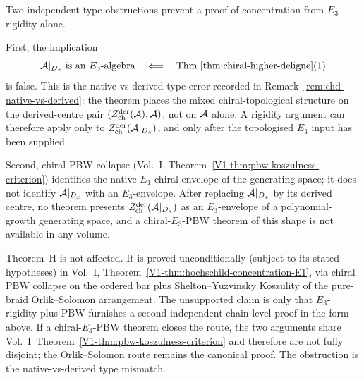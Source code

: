 \begin{remark}%
\label{rem:H-concentration-via-E3-rigidity-type-error-retraction}%
%
%
Two independent type obstructions prevent a proof of concentration
from $E_3$-rigidity alone.

First, the implication
\[
 \cA|_{D_x}\ \text{is an }E_3\text{-algebra}
 \quad\Longleftarrow\quad
 \text{Thm~\ref{thm:chiral-higher-deligne}(1)}
\]
is false. This is the native-vs-derived type error recorded in
Remark~\ref{rem:chd-native-vs-derived}: the theorem places the mixed
chiral-topological structure on the derived-centre pair
$(Z^{\mathrm{der}}_{\mathrm{ch}}(\mathcal{A}),\mathcal{A})$, not on $\mathcal{A}$ alone. A
rigidity argument can therefore apply only to
$Z^{\mathrm{der}}_{\mathrm{ch}}(\mathcal{A}|_{D_x})$, and only after the
topologised $E_3$ input has been supplied.

Second, chiral PBW collapse (Vol.~I,
Theorem~\ref*{V1-thm:pbw-koszulness-criterion}) identifies the
native $E_1$-chiral envelope of the generating space; it does not
identify $\mathcal{A}|_{D_x}$ with an $E_3$-envelope. After replacing
$\mathcal{A}|_{D_x}$ by its derived centre, no theorem presents
$Z^{\mathrm{der}}_{\mathrm{ch}}(\mathcal{A}|_{D_x})$ as an $E_3$-envelope of a
polynomial-growth generating space, and a chiral-$E_3$-PBW theorem of
this shape is not available in any volume.

Theorem~H is not affected. It is proved unconditionally (subject to
its stated hypotheses) in Vol.~I,
Theorem~\ref*{V1-thm:hochschild-concentration-E1}, via chiral PBW
collapse on the ordered bar plus Shelton--Yuzvinsky Koszulity of the
pure-braid Orlik--Solomon arrangement. The unsupported claim is only
that $E_3$-rigidity plus PBW furnishes a second independent
chain-level proof in the form above. If a chiral-$E_3$-PBW theorem
closes the route, the two arguments share
Vol.~I~Theorem~\ref*{V1-thm:pbw-koszulness-criterion} and therefore
are not fully disjoint; the Orlik--Solomon route
remains the canonical proof. The obstruction is the native-vs-derived
type mismatch.
\end{remark}

